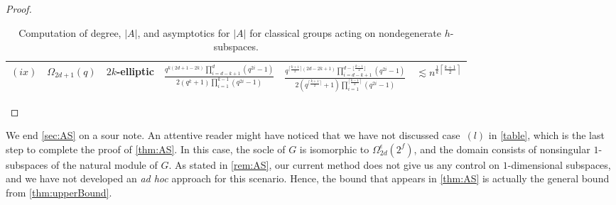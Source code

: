 \documentclass[a4paper]{amsart}
\theoremstyle{definition}
\begin{document}
\begin{proof}
{\begin{table}
\begin{tabularx}{\textwidth}{l l l X X l}
        $(ix)$ & $\Omega_{2d+1}(q)$ &   $2k$-elliptic & $\displaystyle \frac{q^{k(2d+1-2k)}\prod \limits_{i=d-k+1}^{d}(q^{2i} - 1)}{2 (q^k + 1)\prod \limits_{i = 1}^{k-1}(q^{2i} - 1)}$ & $\displaystyle \frac{q^{\lceil \frac{k+1}{2}\rceil (2d-2k+1)}\prod \limits_{i=d-k+1}^{d-\lfloor \frac{k-1}{2}\rfloor}(q^{2i} - 1)}{2 (q^{\lceil \frac{k+1}{2}\rceil} + 1)\prod \limits_{i = 1}^{\lceil \frac{k-1}{2}\rceil}(q^{2i} - 1)}$ & $\displaystyle \lesssim n^{\frac{1}{k} \left\lceil \frac{k+1}{2} \right\rceil}$ \\
        \bottomrule
	\end{tabularx}%
	{\medskip \caption{Computation of degree, $|A|$, and asymptotics for $|A|$ for classical groups acting on nondegenerate $h$-subspaces.}%
    \label{table:ND}}%
\end{table}%
}
\end{proof}

We end \cref{sec:AS} on a sour note. An attentive reader might have noticed that we have not discussed case~$(l)$ in \cref{table}, which is the last step to complete the proof of \cref{thm:AS}. In this case, the socle of $G$ is isomorphic to $\Omega^\epsilon_{2d}(2^f)$, and the domain consists of nonsingular $1$-subspaces of the natural module of $G$. As stated in \cref{rem:AS}, our current method does not give us any control on $1$-dimensional subspaces, and we have not developed an \emph{ad hoc} approach for this scenario. Hence, the bound that appears in \cref{thm:AS} is actually the general bound from \cref{thm:upperBound}.
\end{document}
